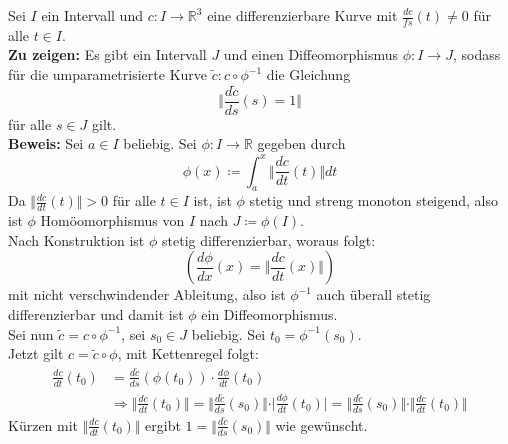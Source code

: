 \begin{problem}[3]
  Sei \( I \) ein Intervall und \( c: I \to \mathbb{R}^3 \) eine differenzierbare Kurve mit \( \frac{dc}{fs}(t) \neq 0 \) für alle \( t \in I \). \\
  \textbf{Zu zeigen:} Es gibt ein Intervall \( J \) und einen Diffeomorphismus \( \phi : I \to J \), sodass für die umparametrisierte Kurve \( \tilde{c}: c \circ \phi^{-1} \) die Gleichung 
  \begin{equation*}
    \Vert \frac{d\tilde{c}}{ds}(s) = 1 \Vert
  \end{equation*}
  für alle \( s \in J \) gilt. \\
  \textbf{Beweis:} Sei \( a \in I \) beliebig. Sei \( \phi: I \to \mathbb{R} \) gegeben durch 
  \begin{equation*}
    \phi(x) \coloneqq \int_a^x { \Vert \frac{dc}{dt}(t) \Vert}dt
  \end{equation*}
  Da \( \Vert \frac{dc}{dt}(t) \Vert > 0 \) für alle \( t \in I \) ist, ist \( \phi \) stetig und streng monoton steigend, also ist \( \phi \) Homöomorphismus von \( I \) nach \( J \coloneqq \phi (I) \). \\
  Nach Konstruktion ist \( \phi \) stetig differenzierbar, woraus folgt:
  \begin{equation*}
    \left(\frac{d \phi}{dx}(x) = \Vert \frac{dc}{dt}(x) \Vert\right)
  \end{equation*}
  mit nicht verschwindender Ableitung, also ist \( \phi^{-1} \) auch überall stetig differenzierbar und damit ist \( \phi \) ein Diffeomorphismus. \\
  Sei nun \( \tilde{c} = c \circ \phi^{-1} \), sei \( s_0 \in J \) beliebig. Sei \( t_0 = \phi^{-1}(s_0) \). \\
  Jetzt gilt \( c = \tilde{c} \circ \phi \), mit Kettenregel folgt:
  \begin{align*}
    \frac{dc}{dt}(t_0) &= \frac{d \tilde{c}}{ds}(\phi(t_0))\cdot \frac{d \phi}{dt}(t_0) \\
    &\Rightarrow \Vert \frac{dc}{dt}(t_0)\Vert = \Vert \frac{d \tilde{c}}{ds}(s_0) \Vert \cdot \vert \frac{d \phi}{dt}(t_0) \vert = \Vert \frac{d \tilde{c}}{ds}(s_0) \Vert \cdot \Vert \frac{dc}{dt}(t_0) \Vert
  \end{align*}
  Kürzen mit \( \Vert \frac{dc}{dt} (t_0) \Vert \) ergibt \( 1 = \Vert \frac{d \tilde{c}}{ds}(s_0) \Vert \) wie gewünscht. \\
\end{problem}



